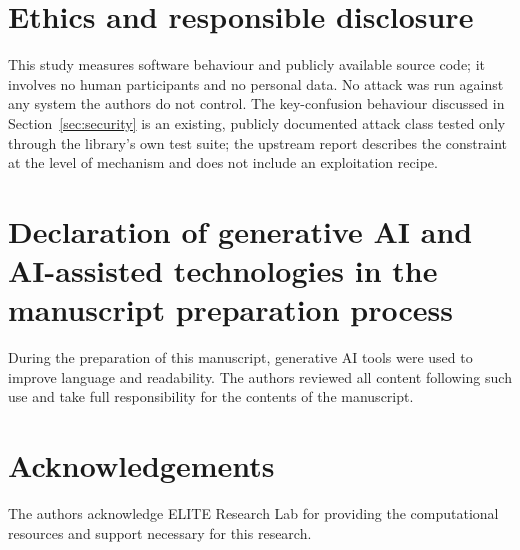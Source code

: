 \documentclass[preprint,12pt,authoryear]{elsarticle}
\begin{document}
\section*{Ethics and responsible disclosure}
This study measures software behaviour and publicly available source code; it
involves no human participants and no personal data. No attack was run against
any system the authors do not control. The key-confusion behaviour discussed in
Section~\ref{sec:security} is an existing, publicly documented attack class
tested only through the library's own test suite; the upstream report
describes the constraint at the level of mechanism and does not include an
exploitation recipe.

\section*{Declaration of generative AI and AI-assisted technologies in the
manuscript preparation process}
During the preparation of this manuscript, generative AI tools were used to
improve language and readability. The authors reviewed all content following
such use and take full responsibility for the contents of the manuscript.

\section*{Acknowledgements}
The authors acknowledge ELITE Research Lab for providing the computational
resources and support necessary for this research.



\end{document}

